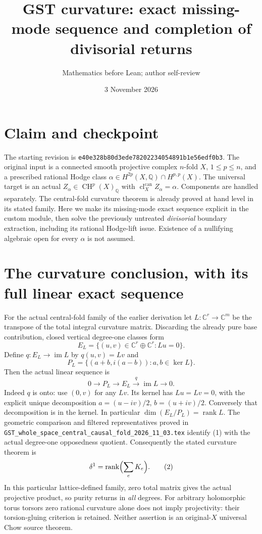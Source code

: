 \documentclass[11pt]{article}
\title{GST curvature: exact missing-mode sequence and completion of divisorial returns}
\author{Mathematics before Lean; author self-review}
\date{3 November 2026}
\newcommand{\Q}{\mathbb Q}
\newcommand{\C}{\mathbb C}
\newcommand{\CH}{\operatorname{CH}}
\newcommand{\cl}{\operatorname{cl}^{\mathrm{can}}}
\begin{document}
\maketitle

\section{Claim and checkpoint}
The starting revision is \texttt{e40e328b80d3ede78202234054891b1e56edf0b3}.
The original input is a connected smooth projective complex $n$-fold $X$,
$1\leq p\leq n$, and a prescribed rational Hodge class
$\alpha\in H^{2p}(X,\Q)\cap H^{p,p}(X)$.
The universal target is an actual $Z_\alpha\in\CH^p(X)_\Q$
with $\cl_X Z_\alpha=\alpha$. Components are handled separately.
The central-fold curvature theorem is already proved at hand level in its
stated family. Here we make its missing-mode exact sequence explicit in
the custom module, then solve the previously untreated \emph{divisorial}
boundary extraction, including its rational Hodge-lift issue.
Existence of a nullifying algebraic open for every $\alpha$ is not assumed.

\section{The curvature conclusion, with its full linear exact sequence}
For the actual central-fold family of the earlier derivation let
$L:\C^r\to\C^m$ be the transpose of the total integral curvature matrix.
Discarding the already pure base contribution, closed vertical degree-one
classes form
\[
 E_L=\{(u,v)\in\C^r\oplus\C^r:Lu=0\}.
\]
Define $q:E_L\to\operatorname{im}L$ by $q(u,v)=Lv$ and
\[
 P_L=\{(a+b,i(a-b)):a,b\in\ker L\}.
\]
Then the actual linear sequence is
\[
 0\longrightarrow P_L\longrightarrow E_L
   \xrightarrow{q}\operatorname{im}L\longrightarrow0.       \tag{1}
\]
Indeed $q$ is onto: use $(0,v)$ for any $Lv$.
Its kernel has $Lu=Lv=0$, with the explicit unique decomposition
$a=(u-iv)/2$, $b=(u+iv)/2$. Conversely that decomposition is in the
kernel. In particular $\dim(E_L/P_L)=\operatorname{rank}L$.
The geometric comparison and filtered representatives proved in
\texttt{GST\_whole\_space\_central\_causal\_fold\_2026\_11\_03.tex}
identify (1) with the actual degree-one opposedness quotient.
Consequently the stated curvature theorem is
\[
 \delta^1=\operatorname{rank}\Bigl(\sum_e K_e\Bigr).
                                                               \tag{2}
\]
In this particular lattice-defined family, zero total matrix gives the
actual projective product, so purity returns in \emph{all} degrees.
For arbitrary holomorphic torus torsors zero rational curvature alone
does not imply projectivity: their torsion-gluing criterion is retained.
Neither assertion is an original-$X$ universal Chow source theorem.
\end{document}
